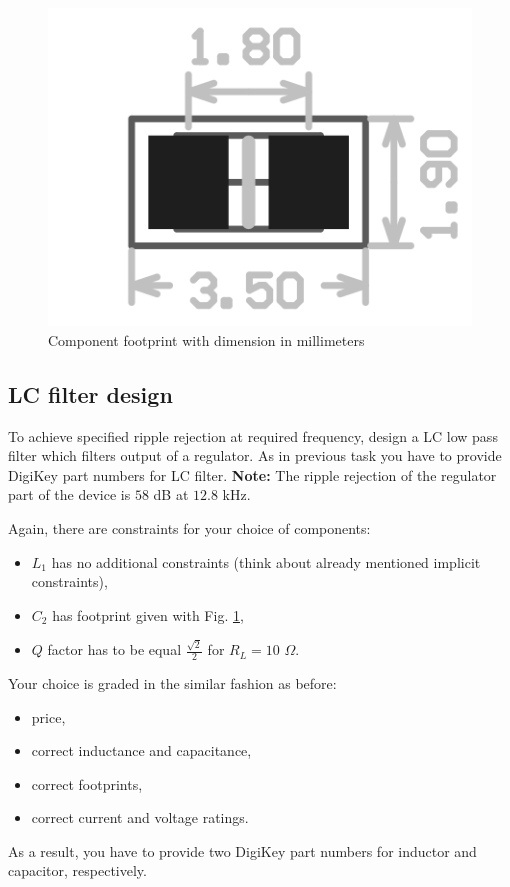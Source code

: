 \documentclass[a4paper]{article}
\begin{document}
\begin{figure}[h!]
\centering
\includegraphics[width=\linewidth]{images/footprint.png}
\caption{Component footprint with dimension in millimeters}
\label{fig:footprint}
\end{figure}

\newpage

\subsection{LC filter design}
\label{ele:task:2}
To achieve specified ripple rejection at required frequency, design a LC low 
pass filter which filters output of a regulator. As in previous task you have 
to provide DigiKey part numbers for LC filter. \textbf{Note:} The ripple 
rejection of the regulator part of the device is $58$ dB at $12.8$ kHz.

Again, there are constraints for your choice of components:
\begin{itemize}
\item $L_1$ has no additional constraints 
(think about already mentioned implicit constraints),
\item $C_2$ has footprint given with Fig. \ref{fig:footprint},
\item $Q$ factor has to be equal $\frac{\sqrt{2}}{2}$ for $R_L = 10$ $\Omega$.  
\end{itemize}

Your choice is graded in the similar fashion as before:
\begin{itemize}
\item price,
\item correct inductance and capacitance,
\item correct footprints, 
\item correct current and voltage ratings.
\end{itemize}
As a result, you have to provide two DigiKey part numbers for inductor and 
capacitor, respectively. 
\newpage
\end{document}

